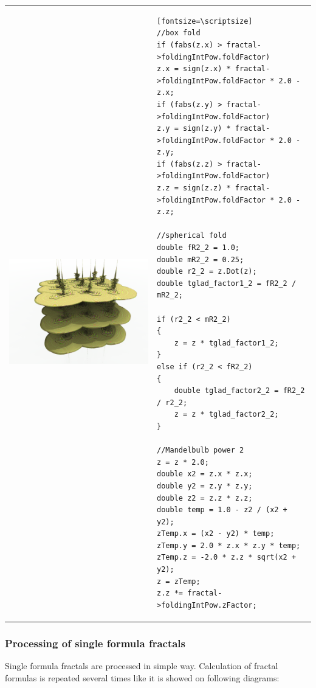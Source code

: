 \begin{tabular}{l l}
	\includegraphics[width=0.3\linewidth]{img/manual/media/formula_box_fold_pwr2.png}	
	& 
	\begin{minipage}[b]{0.5\linewidth}
		\begin{verbatim}[fontsize=\scriptsize]
//box fold
if (fabs(z.x) > fractal->foldingIntPow.foldFactor)
z.x = sign(z.x) * fractal->foldingIntPow.foldFactor * 2.0 - z.x;
if (fabs(z.y) > fractal->foldingIntPow.foldFactor)
z.y = sign(z.y) * fractal->foldingIntPow.foldFactor * 2.0 - z.y;
if (fabs(z.z) > fractal->foldingIntPow.foldFactor)
z.z = sign(z.z) * fractal->foldingIntPow.foldFactor * 2.0 - z.z;

//spherical fold
double fR2_2 = 1.0;
double mR2_2 = 0.25;
double r2_2 = z.Dot(z);
double tglad_factor1_2 = fR2_2 / mR2_2;

if (r2_2 < mR2_2)
{
	z = z * tglad_factor1_2;
}
else if (r2_2 < fR2_2)
{
	double tglad_factor2_2 = fR2_2 / r2_2;
	z = z * tglad_factor2_2;
}

//Mandelbulb power 2
z = z * 2.0;
double x2 = z.x * z.x;
double y2 = z.y * z.y;
double z2 = z.z * z.z;
double temp = 1.0 - z2 / (x2 + y2);
zTemp.x = (x2 - y2) * temp;
zTemp.y = 2.0 * z.x * z.y * temp;
zTemp.z = -2.0 * z.z * sqrt(x2 + y2);
z = zTemp;
z.z *= fractal->foldingIntPow.zFactor;
		\end{verbatim}
	\end{minipage}
\end{tabular} 

\subsubsection{Processing of single formula fractals}

Single formula fractals are processed in simple way. Calculation of fractal formulas is repeated several times like it is showed on following diagrams:\nolinebreak
\nopagebreak

